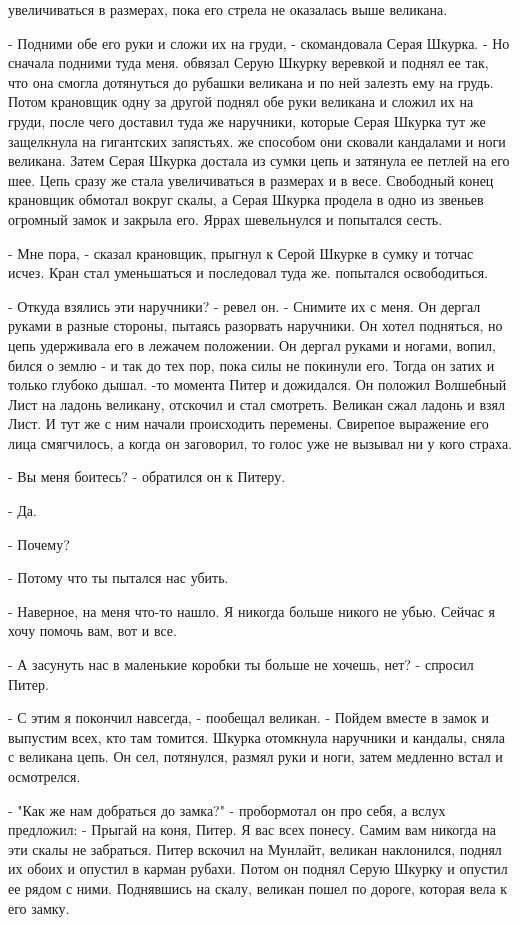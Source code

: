 увеличиваться в размерах, пока его стрела не оказалась выше великана.
\par- Подними обе его руки и сложи их на груди, - скомандовала Серая 
Шкурка. - Но сначала подними туда меня.
 обвязал Серую Шкурку веревкой и поднял ее так, что она 
смогла дотянуться до рубашки великана и по ней залезть ему на грудь. 
Потом крановщик одну за другой поднял обе руки великана и сложил их на 
груди, после чего доставил туда же наручники, которые Серая Шкурка тут 
же защелкнула на гигантских запястьях.
 же способом они сковали кандалами и ноги великана. Затем Серая 
Шкурка достала из сумки цепь и затянула ее петлей на его шее. Цепь 
сразу же стала увеличиваться в размерах и в весе. Свободный конец 
крановщик обмотал вокруг скалы, а Серая Шкурка продела в одно из 
звеньев огромный замок и закрыла его.
 Яррах шевельнулся и попытался сесть.
\par- Мне пора, - сказал крановщик, прыгнул к Серой Шкурке в сумку и 
тотчас исчез. Кран стал уменьшаться и последовал туда же.
 попытался освободиться.
\par- Откуда взялись эти наручники? - ревел он. - Снимите их с меня.
Он дергал руками в разные стороны, пытаясь разорвать наручники. Он 
хотел подняться, но цепь удерживала его в лежачем положении. Он дергал 
руками и ногами, вопил, бился о землю - и так до тех пор, пока силы не 
покинули его. Тогда он затих и только глубоко дышал.
-то момента Питер и дожидался. Он положил Волшебный Лист на 
ладонь великану, отскочил и стал смотреть. Великан сжал ладонь и взял 
Лист. И тут же с ним начали происходить перемены. Свирепое выражение 
его лица смягчилось, а когда он заговорил, то голос уже не вызывал ни 
у кого страха.
\par- Вы меня боитесь? - обратился он к Питеру.
\par- Да.
\par- Почему?
\par- Потому что ты пытался нас убить.
\par- Наверное, на меня что-то нашло. Я никогда больше никого не убью. 
Сейчас я хочу помочь вам, вот и все.
\par- А засунуть нас в маленькие коробки ты больше не хочешь, нет? - 
спросил Питер.
\par- С этим я покончил навсегда, - пообещал великан. - Пойдем вместе 
в замок и выпустим всех, кто там томится.
 Шкурка отомкнула наручники и кандалы, сняла с великана цепь. 
Он сел, потянулся, размял руки и ноги, затем медленно встал и 
осмотрелся.
\par- "Как же нам добраться до замка?" - пробормотал он про себя, а 
вслух предложил: - Прыгай на коня, Питер. Я вас всех понесу. Самим вам 
никогда на эти скалы не забраться.
 Питер вскочил на Мунлайт, великан наклонился, поднял их 
обоих и опустил в карман рубахи. Потом он поднял Серую Шкурку и 
опустил ее рядом с ними. Поднявшись на скалу, великан пошел по дороге, 
которая вела к его замку.
